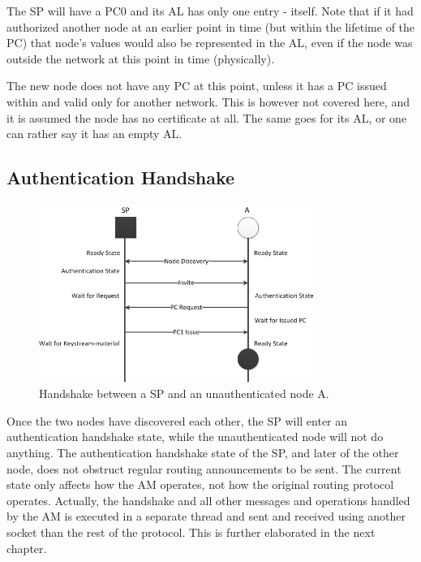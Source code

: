 The \ac{SP} will have a \ac{PC0} and its \ac{AL} has only one entry - itself.
Note that if it had authorized another node at an earlier point in time (but
within the lifetime of the \ac{PC}) that node's values would also be
represented in the \ac{AL}, even if the node was outside the network at this
point in time (physically).

The new node does not have any \ac{PC} at this point, unless it has a \ac{PC}
issued within and valid only for another network. This is however not covered
here, and it is assumed the node has no certificate at all. The same goes for
its \ac{AL}, or one can rather say it has an empty \ac{AL}.

\subsection{Authentication Handshake}

\begin{figure}[h]
	\centering
  	\includegraphics[width=0.8\textwidth]{images/node_states_handshake.png}
  	\caption{Handshake between a SP and an unauthenticated node A.}
	\label{fig:node_states_handshake}
\end{figure}

Once the two nodes have discovered each other, the \ac{SP} will enter an
authentication handshake state, while the unauthenticated node will not do
anything. The authentication handshake state of the \ac{SP}, and later of the
other node, does not obstruct regular routing announcements to be sent. The
current state only affects how the \ac{AM} operates, not how the original
routing protocol operates. Actually, the handshake and all other messages and
operations handled by the \ac{AM} is executed in a separate thread and sent
and received using another socket than the rest of the protocol. This is
further elaborated in the next chapter.


